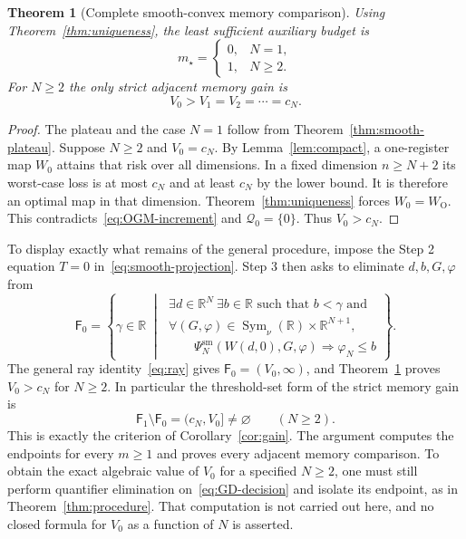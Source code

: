 \documentclass[11pt]{article}
\numberwithin{equation}{section}
\newtheorem{theorem}{Theorem}[section]
\theoremstyle{definition}
\newcommand{\R}{\mathbb R}
\newcommand{\Q}{\mathcal Q}
\DeclareMathOperator{\Sym}{Sym}
\begin{document}
\begin{samepage}
\begin{theorem}[Complete smooth-convex memory comparison]\label{thm:smooth-memory}
Using Theorem~\ref{thm:uniqueness}, the least sufficient auxiliary budget is
\begin{equation}
 m_\star=
 \begin{cases}
 0,&N=1,\\
 1,&N\ge2.
 \end{cases}
 \label{eq:smooth-minmemory}
\end{equation}
For $N\ge2$ the only strict adjacent memory gain is
\begin{equation}
 V_0>V_1=V_2=\cdots=c_N.
 \label{eq:smooth-gap}
\end{equation}
\end{theorem}
\end{samepage}
\begin{proof}
The plateau and the case $N=1$ follow from Theorem~\ref{thm:smooth-plateau}. Suppose $N\ge2$ and $V_0=c_N$. By Lemma~\ref{lem:compact}, a one-register map $W_0$ attains that risk over all dimensions. In a fixed dimension $n\ge N+2$ its worst-case loss is at most $c_N$ and at least $c_N$ by the lower bound. It is therefore an optimal map in that dimension. Theorem~\ref{thm:uniqueness} forces $W_0=W_{\mathrm O}$. This contradicts~\eqref{eq:OGM-increment} and $\Q_0=\{0\}$. Thus $V_0>c_N$.
\end{proof}

To display exactly what remains of the general procedure, impose the Step 2 equation $T=0$ in~\eqref{eq:smooth-projection}. Step 3 then asks to eliminate $d,b,G,\varphi$ from
\begin{equation}
 \mathsf F_0=\left\{\gamma\in\R\;\middle|\;
 \begin{array}{l}
 \exists d\in\R^N\ \exists b\in\R\text{ such that }b<\gamma\text{ and}\\[2pt]
 \forall(G,\varphi)\in\Sym_\nu(\R)\times\R^{N+1},\\[2pt]
 \qquad\Psi_N^{\mathrm{sm}}(W(d,0),G,\varphi)\Rightarrow\varphi_N\le b
 \end{array}
 \right\}.
 \label{eq:GD-decision}
\end{equation}
The general ray identity~\eqref{eq:ray} gives $\mathsf F_0=(V_0,\infty)$, and Theorem~\ref{thm:smooth-memory} proves $V_0>c_N$ for $N\ge2$. In particular the threshold-set form of the strict memory gain is
\begin{equation}
 \mathsf F_1\setminus\mathsf F_0=(c_N,V_0]\ne\varnothing
 \qquad(N\ge2).
 \label{eq:smooth-threshold-gap}
\end{equation}
This is exactly the criterion of Corollary~\ref{cor:gain}. The argument computes the endpoints for every $m\ge1$ and proves every adjacent memory comparison. To obtain the exact algebraic value of $V_0$ for a specified $N\ge2$, one must still perform quantifier elimination on~\eqref{eq:GD-decision} and isolate its endpoint, as in Theorem~\ref{thm:procedure}. That computation is not carried out here, and no closed formula for $V_0$ as a function of $N$ is asserted.
\end{document}
